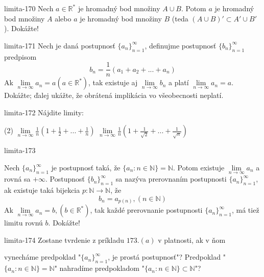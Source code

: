 \begin{defproblem}{limita-170}
Nech $a \in \mathbb{R^*}$ je hromadný bod množiny $A \cup B$. Potom $a$ je
hromadný bod množiny $A$ alebo $a$ je hromadný bod množiny $B$ (teda $(A \cup
B)' \subset A' \cup B'$). Dokážte!
\end{defproblem}

\begin{defproblem}{limita-171}
Nech je daná postupnosť ${\{a_n\}}_{n=1}^\infty$, definujme postupnosť
${\{b_n\}}_{n=1}^\infty$ predpisom
\[b_n=\frac{1}{n}(a_1+a_2+...+a_n)\]
Ak $\lim\limits_{n \rightarrow \infty} a_n=a (a \in \mathbb{R^*})$, tak existuje
aj $\lim\limits_{n \rightarrow \infty} b_n$ a platí $\lim\limits_{n \rightarrow
\infty} a_n=a$. Dokážte; ďalej ukážte, že obrátená implikácia vo všeobecnosti
neplatí.
\end{defproblem}

\begin{defproblem}{limita-172}
Nájdite limity:
\begin{tasks}(2)
\task $\lim\limits_{n \rightarrow \infty} \frac{1}{n}(1+\frac{1}{2}+...+\frac{1}{n})$
\task $\lim\limits_{n \rightarrow \infty} \frac{1}{n}(1+\frac{1}{\sqrt{2}}+...+\frac{1}{\sqrt{n}})$
\end{tasks}
\end{defproblem}

\begin{defproblem}{limita-173}
\begin{tasks}
\task
    Nech ${\{a_n\}}_{n=1}^\infty$ je postupnosť taká, že $\{ a_n: n \in
    \mathbb{N} \}=\mathbb{N}$. Potom existuje $\lim\limits_{n \rightarrow
    \infty} a_n$ a rovná sa $+\infty$.
\task
    Postupnosť ${\{b_n\}}_{n=1}^\infty$ sa nazýva prerovnaním postupnosti
    ${\{a_n\}}_{n=1}^\infty$, ak existuje taká bijekcia $p: \mathbb{N}
    \rightarrow \mathbb{N}$, že
    \[
        b_n=a_{p(n)},(n \in \mathbb{N})
    \]
    Ak $\lim\limits_{n \rightarrow \infty} a_n=b,(b \in \mathbb{R^*})$, tak každé
    prerovnanie postupnosti ${\{a_n\}}_{n=1}^\infty$, má tiež limitu rovnú $b$.
    Dokážte!
\end{tasks}
\end{defproblem}

\begin{defproblem}{limita-174}
Zostane tvrdenie z príkladu $173.(a)$  v platnosti, ak v ňom
\begin{tasks}
\task vynecháme predpoklad "${\{a_n\}}_{n=1}^\infty$, je prostá postupnosť"?
\task Predpoklad "$\{a_n: n \in \mathbb{N}\}=\mathbb{N}$" nahradíme predpokladom "$\{a_n: n \in \mathbb{N}\} \subset \mathbb{N}$"?
\end{tasks}
\end{defproblem}

